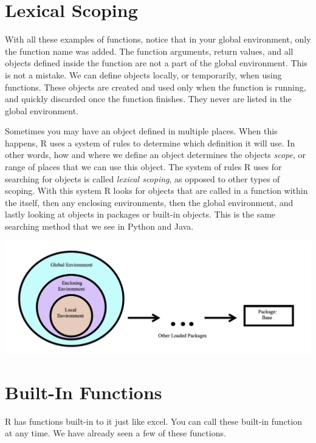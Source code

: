 \documentclass[
]{book}
\begin{document}
\hypertarget{lexical-scoping}{%
\section{Lexical Scoping}\label{lexical-scoping}}

With all these examples of functions, notice that in your global environment, only the function name was added. The function arguments, return values, and all objects defined inside the function are not a part of the global environment. This is not a mistake. We can define objects locally, or temporarily, when using functions. These objects are created and used only when the function is running, and quickly discarded once the function finishes. They never are listed in the global environment.

Sometimes you may have an object defined in multiple places. When this happens, R uses a system of rules to determine which definition it will use. In other words, how and where we define an object determines the objects \emph{scope}, or range of places that we can use this object. The system of rules R uses for searching for objects is called \emph{lexical scoping}, as opposed to other types of scoping. With this system R looks for objects that are called in a function within the itself, then any enclosing environments, then the global environment, and lastly looking at objects in packages or built-in objects. This is the same searching method that we see in Python and Java.

\begin{center}\includegraphics[width=36.5in]{images/Scoping} \end{center}

\hypertarget{built-in-functions}{%
\section{Built-In Functions}\label{built-in-functions}}

R has functions built-in to it just like excel. You can call these built-in function at any time. We have already seen a few of these functions.
\end{document}
